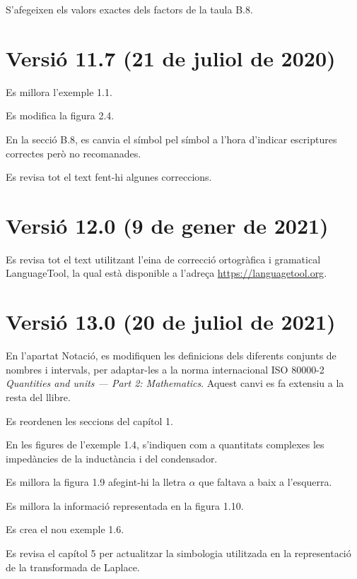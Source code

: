 S'afegeixen els valors exactes dels factors de la taula B.8.


\section*{Versió 11.7 (21 de juliol de 2020)}

Es millora l'exemple 1.1.

Es modifica la figura 2.4.

En la secció B.8, es canvia el símbol \textcolor{Blue}\faQuestionCircle{} pel símbol \textcolor{Blue}\faExclamationTriangle{} a l'hora d'indicar escriptures correctes però no recomanades.

Es revisa tot el text fent-hi algunes correccions.


\section*{Versió 12.0 (9 de gener de 2021)}

Es revisa tot el text utilitzant l'eina de correcció ortogràfica i gramatical \textsf{LanguageTool}, la qual està disponible a l'adreça \href{https://languagetool.org/}{https:/\!\!/languagetool.org}.


\section*{Versió 13.0 (20 de juliol de 2021)}

En l'apartat Notació, es modifiquen les definicions dels diferents conjunts de nombres i intervals, per adaptar-les a la norma internacional ISO 80000-2 \textit{Quantities and units --- Part 2: Mathematics}. Aquest canvi es fa extensiu a la resta del llibre.

Es reordenen les seccions del capítol 1.

En les figures de l'exemple 1.4, s'indiquen com a quantitats complexes les impedàncies de la inductància i del condensador.

Es millora la figura 1.9 afegint-hi la lletra $\alpha$ que faltava  a baix a l'esquerra.

Es millora la informació representada en la figura 1.10.

Es crea el nou exemple 1.6.

Es revisa el capítol 5 per actualitzar la simbologia utilitzada en la representació de la transformada de Laplace.

